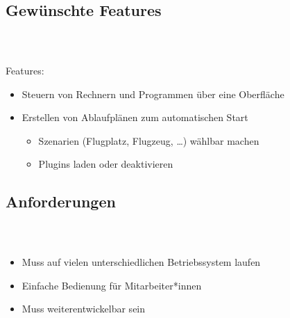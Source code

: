 \documentclass[accentcolor=tud1b,colorbacktitle,landscape,german,presentation]{tudbeamer}
\newcommand{\ftitle}{
	\frametitle{\insertsectionhead \\ {\small \insertsubsectionhead}}
}
\begin{document}
\subsection{Gewünschte Features}
\begin{frame}
	\ftitle
	Features:
	\begin{itemize}
		\item Steuern von Rechnern und Programmen über eine Oberfläche\pause
		\item Erstellen von Ablaufplänen zum automatischen Start\pause
			\begin{itemize}
				\item Szenarien (Flugplatz, Flugzeug, \dots) wählbar machen\pause
				\item Plugins laden oder deaktivieren
			\end{itemize}
	\end{itemize}
\end{frame}

\subsection{Anforderungen}
\begin{frame}
	\ftitle
	\begin{itemize}
		\item Muss auf vielen unterschiedlichen Betriebssystem laufen\pause
		\item Einfache Bedienung für Mitarbeiter*innen\pause
		\item Muss weiterentwickelbar sein
	\end{itemize}
\end{frame}
\end{document}
